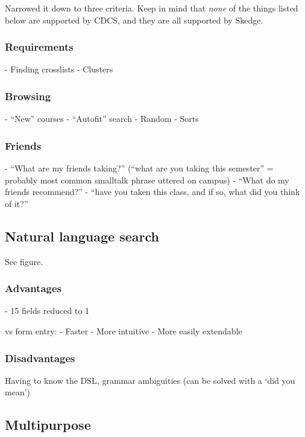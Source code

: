 Narrowed it down to three criteria. Keep in mind that \emph{none} of the things listed below are supported by CDCS, and they are all supported by Skedge.

  \subsubsection{Requirements}

  - Finding crosslists
  - Clusters

  \subsubsection{Browsing}

  - ``New'' courses
  - ``Autofit'' search
  - Random
  - Sorts

  \subsubsection{Friends}

  - ``What are my friends taking?'' (``what are you taking this semester'' = probably most common smalltalk phrase uttered on campus)
  - ``What do my friends recommend?'' - ``have you taken this class, and if so, what did you think of it?''

\subsection{Natural language search}


See figure.

  \subsubsection{Advantages}

  - 15 fields reduced to 1

  vs form entry:
  - Faster
  - More intuitive
  - More easily extendable

  \subsubsection{Disadvantages}

  Having to know the DSL, grammar ambiguities (can be solved with a `did you mean')

\subsection{Multipurpose}

